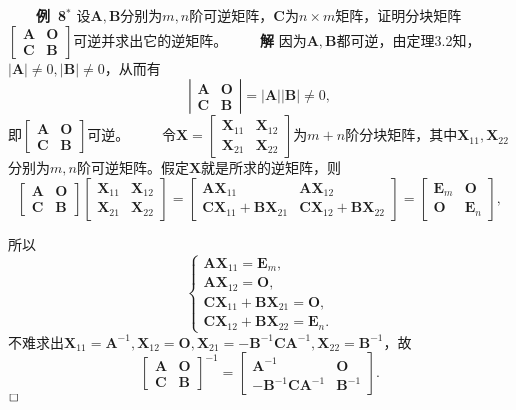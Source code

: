 \documentclass[compress,mathserif,cjk]{beamer}
\theoremstyle{remark}
\numberwithin{equation}{section}
\newcommand{\hei}{\bf}      %
\begin{document}
\begin{CJK}{UTF8}{gbsn}
\begin{frame}
 \ \ \ \ {\hei 例~8$^*$} 设$\bm A,\bm B$分别为$m,n$阶可逆矩阵，$\bm C$为$n\times m$矩阵，证明分块矩阵$\left[\begin{matrix}\bm A&\bm O\\ \bm C&\bm B\end{matrix}\right]$可逆并求出它的逆矩阵。
 \pause\vskip 5pt
 \ \ \ \ {\hei 解} 因为$\bm A,\bm B$都可逆，由定理3.2知，$|\bm A|\neq0,|\bm B|\neq0$，从而有
 $$\left|\begin{matrix}\bm A&\bm O\\ \bm C&\bm B\end{matrix}\right|=|\bm A||\bm B|\neq0,$$
 即$\left[\begin{matrix}\bm A&\bm O\\ \bm C&\bm B\end{matrix}\right]$可逆。
 \pause\vskip 5pt
 \ \ \ \ 令$\bm X=\left[\begin{matrix}\bm X_{11}&\bm X_{12}\\ \bm X_{21}&\bm X_{22}\end{matrix}\right]$为$m+n$阶分块矩阵，其中$\bm X_{11},\bm X_{22}$分别为$m,n$阶可逆矩阵。假定$\bm X$就是所求的逆矩阵，则
 \footnotesize
 $$\left[\begin{matrix}\bm A&\bm O\\ \bm C&\bm B\end{matrix}\right]\left[\begin{matrix}\bm X_{11}&\bm X_{12}\\ \bm X_{21}&\bm X_{22}\end{matrix}\right]
 =\left[\begin{matrix}\bm {AX}_{11}&\bm {AX}_{12}\\ \bm {CX}_{11}+\bm{BX}_{21}&\bm{CX}_{12}+\bm{BX}_{22}\end{matrix}\right]
 =\left[\begin{matrix}\bm E_m&\bm O\\ \bm O&\bm E_n\end{matrix}\right],$$
\end{frame}

\begin{frame}
 所以
 $$\left\{\begin{array}{l}
 \bm A\bm X_{11}=\bm E_m,\\\bm A\bm X_{12}=\bm O,\\\bm {CX}_{11}+\bm{BX}_{21}=\bm O,\\\bm{CX}_{12}+\bm{BX}_{22}=\bm E_n.
 \end{array}\right.$$
 不难求出$\bm X_{11}=\bm A^{-1},\bm X_{12}=\bm O,\bm X_{21}=-\bm B^{-1}\bm C\bm A^{-1},\bm X_{22}=\bm B^{-1}$，故
 $$\left[\begin{matrix}\bm A&\bm O\\ \bm C&\bm B\end{matrix}\right]^{-1}=\left[\begin{matrix}\bm A^{-1}&\bm O\\ -\bm B^{-1}\bm C\bm A^{-1}&\bm B^{-1}\end{matrix}\right].$$$\hfill\Box$
\end{frame}


\end{CJK}
\end{document}
